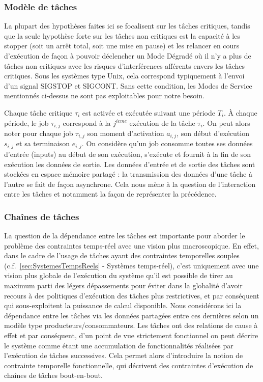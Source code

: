\documentclass[french, a4paper, 11pt, twoside, pdftex]{StyleThese}
\begin{document}
    	
    	\subsubsection{Modèle de tâches}
		La plupart des hypothèses faites ici se focalisent sur les tâches critiques, tandis que la seule hypothèse forte sur les tâches non critiques est la capacité à les stopper (soit un arrêt total, soit une mise en pause) et les relancer en cours d'exécution de façon à pouvoir déclencher un Mode Dégradé où il n'y a plus de tâches non critiques avec les risques d'interférences afférents envers les tâches critiques. Sous les systèmes type Unix, cela correspond typiquement à l'envoi d'un signal SIGSTOP et SIGCONT. Sans cette condition, les Modes de Service mentionnés ci-dessus ne sont pas exploitables pour notre besoin. 
		
		Chaque tâche critique $\tau_i$ est activée et exécutée suivant une période $T_i$. 
		À chaque période, le job $\tau_{i,j}$ correspond à la $j^{ieme}$ exécution de la tâche $\tau_i$. 
		On peut alors noter pour chaque job $\tau_{i,j}$ son moment d'activation $a_{i,j}$, son début d'exécution $s_{i,j}$ et sa terminaison $e_{i,j}$. 
		On considère qu'un job consomme toutes ses données d'entrée (inputs) au début de son exécution, s'exécute et fournit à la fin de son exécution les données de sortie. Les données d'entrée et de sortie des tâches sont stockées en espace mémoire partagé : la transmission des données d'une tâche à l'autre se fait de façon asynchrone.
		Cela nous mène à la question de l'interaction entre les tâches et notamment la façon de représenter la précédence.
    	
    	\subsubsection{Chaînes de tâches}
	    La question de la dépendance entre les tâches est importante pour aborder le problème des contraintes temps-réel avec une vision plus macroscopique. En effet, dans le cadre de l'usage de tâches ayant des contraintes temporelles souples (c.f.~\autoref{sec:SystemesTempsReels} - Systèmes temps-réel), c'est uniquement avec une vision plus globale de l'exécution du système qu'il est possible de tirer au maximum parti des légers dépassements pour éviter dans la globalité d'avoir recours à des politiques d'exécution des tâches plus restrictives, et par conséquent qui sous-exploitent la puissance de calcul disponible.
	    Nous considérons ici la dépendance entre les tâches via les données partagées entre ces dernières selon un modèle type producteurs/consommateurs. Les tâches ont des relations de cause à effet et par conséquent, d'un point de vue strictement fonctionnel on peut décrire le système comme étant une accumulation de fonctionnalités réalisées par l'exécution de tâches successives. Cela permet alors d'introduire la notion de contrainte temporelle fonctionnelle, qui décrivent des contraintes d'exécution de chaînes de tâches bout-en-bout.
	    
\end{document}
